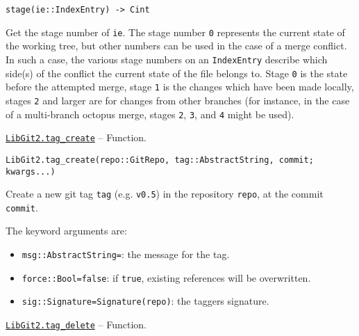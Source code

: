 \begin{adjustwidth}{2em}{0pt}


\begin{verbatim}
stage(ie::IndexEntry) -> Cint
\end{verbatim}

Get the stage number of \texttt{ie}. The stage number \texttt{0} represents the current state of the working tree, but other numbers can be used in the case of a merge conflict. In such a case, the various stage numbers on an \texttt{IndexEntry} describe which side(s) of the conflict the current state of the file belongs to. Stage \texttt{0} is the state before the attempted merge, stage \texttt{1} is the changes which have been made locally, stages \texttt{2} and larger are for changes from other branches (for instance, in the case of a multi-branch {\textquotedbl}octopus{\textquotedbl} merge, stages \texttt{2}, \texttt{3}, and \texttt{4} might be used).



\end{adjustwidth}
\hypertarget{4898692620083276733}{}
\hyperlink{4898692620083276733}{\texttt{LibGit2.tag\_create}}  -- {Function.}

\begin{adjustwidth}{2em}{0pt}


\begin{verbatim}
LibGit2.tag_create(repo::GitRepo, tag::AbstractString, commit; kwargs...)
\end{verbatim}

Create a new git tag \texttt{tag} (e.g. \texttt{{\textquotedbl}v0.5{\textquotedbl}}) in the repository \texttt{repo}, at the commit \texttt{commit}.

The keyword arguments are:

\begin{itemize}
\item \texttt{msg::AbstractString={\textquotedbl}{\textquotedbl}}: the message for the tag.


\item \texttt{force::Bool=false}: if \texttt{true}, existing references will be overwritten.


\item \texttt{sig::Signature=Signature(repo)}: the tagger{\textquotesingle}s signature.

\end{itemize}


\end{adjustwidth}
\hypertarget{7680948887680773639}{}
\hyperlink{7680948887680773639}{\texttt{LibGit2.tag\_delete}}  -- {Function.}

